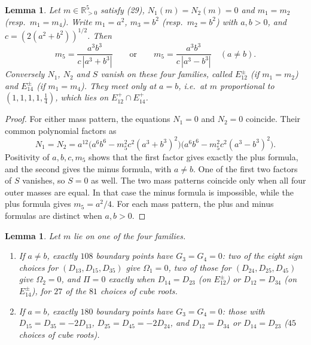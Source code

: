 \documentclass[Threeside,11pt]{article}
\newtheorem{lemma}[theorem]{Lemma}
\theoremstyle{definition}
\theoremstyle{remark}
\numberwithin{equation}{section}
\theoremstyle{remark}
\newcommand{\Rp}{\mathbb{R}_{>0}}
\newenvironment{alphalist}{\begin{enumerate}\renewcommand{\labelenumi}{(\alph{enumi})}%
  \renewcommand{\theenumi}{\alph{enumi}}}{\end{enumerate}}
\begin{document}
{\begin{lemma}\label{lem:d3-curves}
Let $m\in\Rp^5$ satisfy (29), $N_1(m)=N_2(m)=0$ and $m_1=m_2$ (resp.\
$m_1=m_4$).  Write $m_1=a^2$, $m_3=b^2$ (resp.\ $m_2=b^2$) with $a,b>0$, and
$c=(2(a^2+b^2))^{1/2}$.  Then
\[
m_5=\frac{a^3b^3}{c\,|a^3+b^3|}\qquad\text{or}\qquad m_5=\frac{a^3b^3}{c\,|a^3-b^3|}\quad(a\ne b).
\]
Conversely $N_1$, $N_2$ and $S$ vanish on these four families, called
$E^\pm_{12}$ (if $m_1=m_2$) and $E^\pm_{14}$ (if $m_1=m_4$).  They meet only at $a=b$, i.e.\ at
$m$ proportional to $(1,1,1,1,\frac14)$, which lies on $E^+_{12}\cap E^+_{14}$.
\end{lemma}}

{\begin{proof}
For either mass pattern, the equations $N_1=0$ and
$N_2=0$ coincide. Their common polynomial factors as
\[
 N_1=N_2
 =a^{12}\bigl(a^6b^6-m_5^2c^2(a^3+b^3)^2\bigr)
          \bigl(a^6b^6-m_5^2c^2(a^3-b^3)^2\bigr).
\]
Positivity of $a,b,c,m_5$ shows that the first factor gives exactly the plus
formula, and the second gives the minus formula, with $a\ne b$.
One of the first two factors of $S$ vanishes, so $S=0$ as well.
The two mass patterns coincide only when all four outer masses are equal.
In that case the minus formula is impossible, while the plus formula gives $m_5=a^2/4$.
For each mass pattern, the plus and minus formulas are distinct when $a,b>0$.
\end{proof}

\begin{lemma}\label{lem:d3-census}
Let $m$ lie on one of the four families.
\begin{alphalist}
  \item If $a\ne b$, exactly $108$ boundary points have $G_3=G_4=0$: two of the eight sign choices for
  $(D_{13},D_{15},D_{35})$ give $\Omega_1=0$, two of those for $(D_{24},D_{25},D_{45})$
  give $\Omega_2=0$, and $\Pi=0$ exactly when $D_{14}=D_{23}$ (on $E^\pm_{12}$) or
  $D_{12}=D_{34}$ (on $E^\pm_{14}$), for $27$ of the $81$ choices of cube roots.
  \item If $a=b$, exactly $180$ boundary points have $G_3=G_4=0$: those with $D_{15}=D_{35}=-2D_{13}$,
  $D_{25}=D_{45}=-2D_{24}$, and $D_{12}=D_{34}$ or $D_{14}=D_{23}$ ($45$ choices of cube roots).
\end{alphalist}
\end{lemma}}
\end{document}
